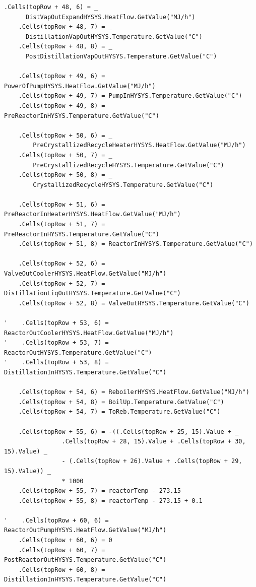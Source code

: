 \documentclass[a4j]{jsreport}
\begin{document}
\begin{lstlisting}[caption=HYSYSとpythonを繋ぐコード]
    .Cells(topRow + 48, 6) = _
      DistVapOutExpandHYSYS.HeatFlow.GetValue("MJ/h")
    .Cells(topRow + 48, 7) = _
      DistillationVapOutHYSYS.Temperature.GetValue("C")
    .Cells(topRow + 48, 8) = _
      PostDistillationVapOutHYSYS.Temperature.GetValue("C")

    .Cells(topRow + 49, 6) = PowerOfPumpHYSYS.HeatFlow.GetValue("MJ/h")
    .Cells(topRow + 49, 7) = PumpInHYSYS.Temperature.GetValue("C")
    .Cells(topRow + 49, 8) = PreReactorInHYSYS.Temperature.GetValue("C")

    .Cells(topRow + 50, 6) = _
        PreCrystallizedRecycleHeaterHYSYS.HeatFlow.GetValue("MJ/h")
    .Cells(topRow + 50, 7) = _
        PreCrystallizedRecycleHYSYS.Temperature.GetValue("C")
    .Cells(topRow + 50, 8) = _
        CrystallizedRecycleHYSYS.Temperature.GetValue("C")

    .Cells(topRow + 51, 6) = PreReactorInHeaterHYSYS.HeatFlow.GetValue("MJ/h")
    .Cells(topRow + 51, 7) = PreReactorInHYSYS.Temperature.GetValue("C")
    .Cells(topRow + 51, 8) = ReactorInHYSYS.Temperature.GetValue("C")

    .Cells(topRow + 52, 6) = ValveOutCoolerHYSYS.HeatFlow.GetValue("MJ/h")
    .Cells(topRow + 52, 7) = DistillationLiqOutHYSYS.Temperature.GetValue("C")
    .Cells(topRow + 52, 8) = ValveOutHYSYS.Temperature.GetValue("C")

'    .Cells(topRow + 53, 6) = ReactorOutCoolerHYSYS.HeatFlow.GetValue("MJ/h")
'    .Cells(topRow + 53, 7) = ReactorOutHYSYS.Temperature.GetValue("C")
'    .Cells(topRow + 53, 8) = DistillationInHYSYS.Temperature.GetValue("C")

    .Cells(topRow + 54, 6) = ReboilerHYSYS.HeatFlow.GetValue("MJ/h")
    .Cells(topRow + 54, 8) = BoilUp.Temperature.GetValue("C")
    .Cells(topRow + 54, 7) = ToReb.Temperature.GetValue("C")

    .Cells(topRow + 55, 6) = -((.Cells(topRow + 25, 15).Value + _
                .Cells(topRow + 28, 15).Value + .Cells(topRow + 30, 15).Value) _
                - (.Cells(topRow + 26).Value + .Cells(topRow + 29, 15).Value)) _
                * 1000
    .Cells(topRow + 55, 7) = reactorTemp - 273.15
    .Cells(topRow + 55, 8) = reactorTemp - 273.15 + 0.1

'    .Cells(topRow + 60, 6) = ReactorOutPumpHYSYS.HeatFlow.GetValue("MJ/h")
    .Cells(topRow + 60, 6) = 0
    .Cells(topRow + 60, 7) = PostReactorOutHYSYS.Temperature.GetValue("C")
    .Cells(topRow + 60, 8) = DistillationInHYSYS.Temperature.GetValue("C")


\end{lstlisting}
\end{document}
